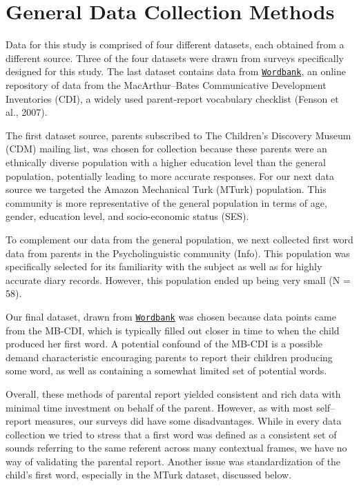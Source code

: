 \documentclass[10pt,letterpaper]{article}
\begin{document}
\section{General Data Collection Methods}
Data for this study is comprised of four different datasets, each obtained from a different source. Three of the four datasets were drawn from surveys specifically designed for this study. The last dataset contains data from \href{http://wordbank.stanford.edu}{\tt{Wordbank}}, an online repository of data from the MacArthur--Bates Communicative Development Inventories (CDI), a widely used parent-report vocabulary checklist (Fenson et al., 2007).

The first dataset source, parents subscribed to The Children's Discovery Museum (CDM) mailing list, was chosen for collection because these parents were an ethnically diverse population with a higher education level than the general population, potentially leading to more accurate responses. For our next data source we targeted the Amazon Mechanical Turk (MTurk) population. This community is more representative of the general population in terms of age, gender, education level, and socio-economic status (SES). 

To complement our data from the general population, we next collected first word data from parents in the Psycholinguistic community (Info). This population was specifically selected for its familiarity with the subject as well as for highly accurate diary records. However, this population ended up being very small (N = 58).

Our final dataset, drawn from \href{http://wordbank.stanford.edu}{\tt{Wordbank}} was chosen because data points came from the MB-CDI, which is typically filled out closer in time to when the child produced her first word. A potential confound of the MB-CDI is a possible demand characteristic encouraging parents to report their children producing some word, as well as containing a somewhat limited set of potential words.

Overall, these methods of parental report yielded consistent and rich data with minimal time investment on behalf of the parent. However, as with most self--report measures, our surveys did have some disadvantages. While in every data collection we tried to stress that a first word was defined as a consistent set of sounds referring to the same referent across many contextual frames, we have no way of validating the parental report. Another issue was standardization of the child's first word, especially in the MTurk dataset, discussed below. 
\end{document}
